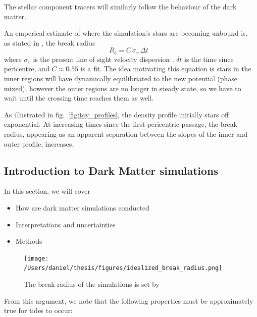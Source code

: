 The stellar component tracers will similarly follow the behaviour of the
dark matter.

An emperical estimate of where the simulation's stars are becoming
unbound is, as stated in \citet{PNM2008}, the break radius \[
R_b = C\,\sigma_{v}\,\Delta t
\] where \(\sigma_v\) is the present line of sight velocity dispersion ,
\(\delta t\) is the time since pericentre, and \(C \approx 0.55\) is a
fit. The idea motivating this equation is stars in the inner regions
will have dynamically equilibriated to the new potential (phase mixed),
however the outer regions are no longer in steady state, so we have to
wait until the crossing time reaches them as well.

As illustrated in fig.~\ref{fig:toy_profiles}, the density profile
initially stars off exponential. At increasing times since the first
pericentric passage, the break radius, appearing as an apparent
separation between the slopes of the inner and outer profile, increases.

\subsection{Introduction to Dark Matter
simulations}\label{introduction-to-dark-matter-simulations}

In this section, we will cover

\begin{itemize}
\tightlist
\item
  How are dark matter simulations conducted
\item
  Interpretations and uncertainties
\item
  Methods
\end{itemize}

\begin{figure}
\centering
\texttt{[image: /Users/daniel/thesis/figures/idealized\_break\_radius.png]}
\caption[Break radius validation]{The break radius of the simulations is
set by}\label{fig:idealized_break_radius}
\end{figure}

From this argument, we note that the following properties must be
approximately true for tides to occur:

